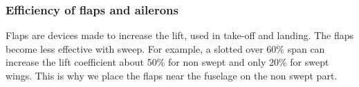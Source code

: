 \subsubsection{Efficiency of flaps and ailerons}
	Flaps are devices made to increase the lift, used in take-off and landing. The flaps become less effective with sweep. For example, a slotted over 60\% span can increase the lift coefficient about 50\% for non swept and only 20\% for swept wings. This is why we place the flaps near the fuselage on the non swept part. 